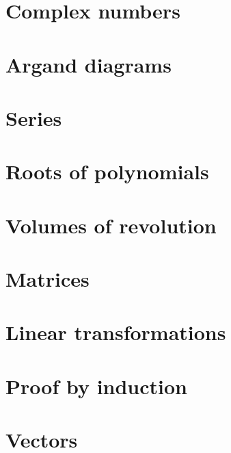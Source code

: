 \chapter{Complex numbers}

\chapter{Argand diagrams}

\chapter{Series}

\chapter{Roots of polynomials}

\chapter{Volumes of revolution}

\chapter{Matrices}

\chapter{Linear transformations}

\chapter{Proof by induction}

\chapter{Vectors}

